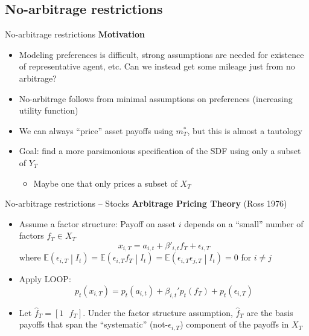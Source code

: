 \documentclass[xcolor=table, aspectratio=169]{beamer}
\begin{document}
\subsection{No-arbitrage restrictions}

\begin{frame}{No-arbitrage restrictions}
\textbf{Motivation}
\begin{itemize}
\item Modeling preferences is difficult, strong assumptions are needed for existence of representative agent, etc. Can we instead get some mileage just from no arbitrage?
\item No-arbitrage follows from minimal assumptions on preferences (increasing utility function)
\item We can always ``price'' asset payoffs using $m_T^*$, but this is almost a tautology
\item Goal: find a more parsimonious specification of the SDF using only a subset of $Y_T$
\begin{itemize}
\item Maybe one that only prices a subset of $X_T$
\end{itemize}
\end{itemize}
\end{frame}

\begin{frame}{No-arbitrage restrictions -- Stocks}
\textbf{Arbitrage Pricing Theory} (Ross 1976)
\begin{itemize}
\item Assume a factor structure: Payoff on asset $i$ depends on a ``small'' number of factors $f_T \in X_T$
$$x_{i,T} = a_{i,t} + \beta'_{i,t} f_T + \epsilon_{i,T}$$
where $\mathbb{E} \left( \epsilon_{i,T} \middle \vert I_t \right) = \mathbb{E} \left( \epsilon_{i,T} f_T \middle \vert I_t \right) = \mathbb{E} \left( \epsilon_{i,T} \epsilon_{j,T} \middle \vert I_t \right) = 0$ for $i\neq j$
\item Apply LOOP:
$$p_t(x_{i,T}) = p_t(a_{i,t}) + \beta_{i,t}' p_t(f_T) + p_t(\epsilon_{i,T})$$
\item Let $\hat{f}_T = [ 1 \hspace{8pt} f_T ]$. Under the factor structure assumption, $\hat{f}_T$ are the basis payoffs that span the ``systematic'' (not-$\epsilon_{i,T}$) component of the payoffs in $X_T$
\end{itemize}
\end{frame}
\end{document}
